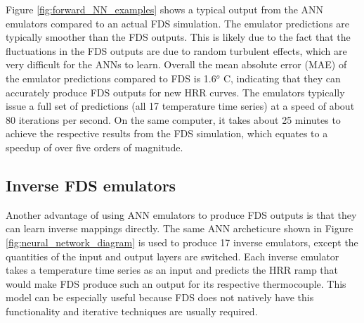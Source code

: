 \documentclass{article}
\begin{document}
Figure \protect\ref{fig:forward_NN_examples} shows a typical output from the ANN emulators compared to an actual FDS simulation. The emulator predictions are typically smoother than the FDS outputs. This is likely due to the fact that the fluctuations in the FDS outputs are due to random turbulent effects, which are very difficult for the ANNs to learn. Overall the mean absolute error (MAE) of the emulator predictions compared to FDS is 1.6$^o$ C, indicating that they can accurately produce FDS outputs for new HRR curves. The emulators typically issue a full set of predictions (all 17 temperature time series) at a speed of about 80 iterations per second. On the same computer, it takes about 25 minutes to achieve the respective results from the FDS simulation, which equates to a speedup of over five orders of magnitude. 


\subsection{Inverse FDS emulators}
Another advantage of using ANN emulators to produce FDS outputs is that they can learn inverse mappings directly. The same ANN archeticure shown in Figure \ref{fig:neural_network_diagram} is used to produce 17 inverse emulators, except the quantities of the input and output layers are switched.  Each inverse emulator takes a temperature time series as an input and predicts the HRR ramp that would make FDS produce such an output for its respective thermocouple. This model can be especially useful because FDS does not natively have this functionality and iterative techniques are usually required. 
\end{document}
